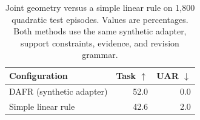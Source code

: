 \begin{table}[t]
\centering
\small
\setlength{\tabcolsep}{3pt}
\begin{tabular}{lrr}
\toprule
Configuration & Task $\uparrow$ & UAR $\downarrow$\\
\midrule
DAFR (synthetic adapter) & 52.0 & 0.0 \\
Simple linear rule & 42.6 & 2.0 \\
\bottomrule
\end{tabular}
\caption{Joint geometry versus a simple linear rule on 1,800 quadratic test episodes. Values are percentages. Both methods use the same synthetic adapter, support constraints, evidence, and revision grammar.}
\label{tab:synthetic-geometry}
\end{table}
